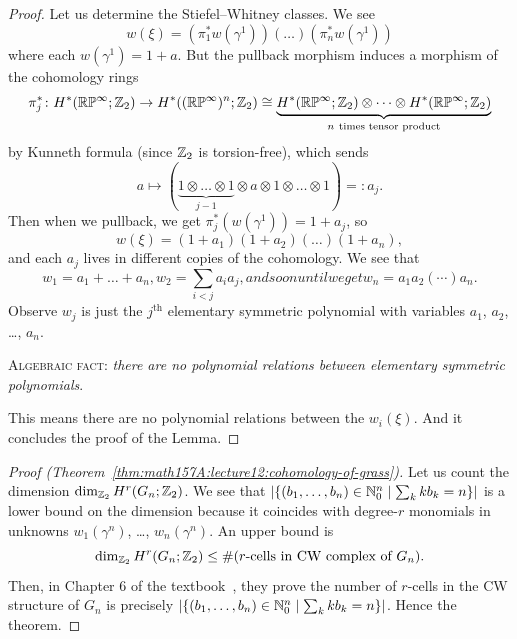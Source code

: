 \begin{proof}
Let us determine the Stiefel--Whitney classes. We see
\begin{equation}
w(\xi)=\left(\pi_{1}^{*}w(\gamma^{1})\right)(\dots)\left(\pi_{n}^{*}w(\gamma^{1})\right)
\end{equation}
where each $w(\gamma^{1})=1+a$. But the pullback morphism induces a
morphism of the cohomology rings
\begin{equation}
\pi_{j}^{*}\colon H^{*}(\mathbb{R}\mathbb{P}^{\infty};\mathbb{Z}_{2})\to H^{*}((\mathbb{R}\mathbb{P}^{\infty})^{n};\mathbb{Z}_{2})\cong
\underbrace{H^{*}(\mathbb{R}\mathbb{P}^{\infty};\mathbb{Z}_{2})\otimes\dots\otimes H^{*}(\mathbb{R}\mathbb{P}^{\infty};\mathbb{Z}_{2})}_{n~\text{times tensor product}}
\end{equation}
by Kunneth formula (since $\mathbb{Z}_{2}$ is torsion-free), which sends
\begin{equation}
a\mapsto(\underbrace{1\otimes\dots\otimes1}_{j-1}\otimes a\otimes1\otimes\dots\otimes1)=:a_{j}.
\end{equation}
Then when we pullback, we get $\pi_{j}^{*}(w(\gamma^{1}))=1+a_{j}$, so 
\begin{equation}
w(\xi)=(1+a_{1})(1+a_{2})(\dots)(1+a_{n}),
\end{equation}
and each $a_{j}$ lives in different copies of the cohomology. We see
that
\begin{subequations}
\begin{equation}
w_{1}=a_{1}+\dots+a_{n},
\end{equation}
\begin{equation}
w_{2}=\sum_{i<j}a_{i}a_{j},
\end{equation}
and so on until we get
\begin{equation}
w_{n}=a_{1}a_{2}(\cdots)a_{n}.
\end{equation}
\end{subequations}
Observe $w_{j}$ is just the $j^{\text{th}}$ elementary symmetric
polynomial with variables $a_{1}$, $a_{2}$, \dots, $a_{n}$.

\textsc{Algebraic fact}: \emph{there are no polynomial relations
between elementary symmetric polynomials}.

This means there are no polynomial relations between the
$w_{i}(\xi)$. And it concludes the proof of the Lemma.
\end{proof}

\begin{proof}[{Proof (Theorem~\ref{thm:math157A:lecture12:cohomology-of-grass})}]
Let us count the dimension $\dim_{\mathbb{Z}_{2}}H^{r}(G_{n};\mathbb{Z}_{2})$. We
see that
$|\{(b_{1},\dots,b_{n})\in\mathbb{N}_{0}^{n}\mid\sum_{k}kb_{k}=n\}|$ is a
lower bound on the dimension because it coincides with degree-$r$
monomials in unknowns $w_{1}(\gamma^{n})$, \dots,
$w_{n}(\gamma^{n})$. An upper bound is
\begin{equation}
\dim_{\mathbb{Z}_{2}}H^{r}(G_{n};\mathbb{Z}_{2})\leq\#\mbox{($r$-cells in CW complex of $G_{n}$)}.
\end{equation}
Then, in Chapter 6 of the textbook~\cite{milnor1974characteristic},
they prove the number of $r$-cells in the CW structure of $G_{n}$ is
precisely 
$|\{(b_{1},\dots,b_{n})\in\mathbb{N}_{0}^{n}\mid\sum_{k}kb_{k}=n\}|$.
Hence the theorem.
\end{proof}

